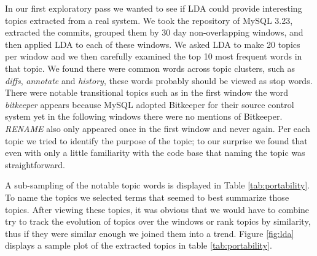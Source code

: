 \documentclass[times, 10pt,twocolumn]{article}
\begin{document}
In our first exploratory pass we wanted to see if LDA could provide
interesting topics extracted from a real system. We took the
repository of MySQL 3.23, extracted the commits, grouped them by 30
day non-overlapping windows, and then applied LDA to each of these
windows. We asked LDA to make 20 topics per window and we then
carefully examined the top 10 most frequent words in that topic.  We
found there were common words across topic clusters, such as
\emph{diffs}, \emph{annotate} and \emph{history}, these words probably should
be viewed as stop words. There were notable transitional topics such
as in the first window the word \emph{bitkeeper} appears because MySQL
adopted Bitkeeper for their source control system yet in the following
windows there were no mentions of Bitkeeper. \emph{RENAME} also only
appeared once in the first window and never again. Per each topic we
tried to identify the purpose of the topic; to our surprise we found
that even with only a little familiarity with the code base that
naming the topic was straightforward.

A sub-sampling of the notable topic words is displayed in Table
\ref{tab:portability}.  To name the topics we selected terms that
seemed to best summarize those topics.  After viewing these topics, it was
obvious that we would have to combine try to track the evolution of
topics over the windows or rank topics by similarity, thus if they
were similar enough we joined them into a trend. Figure \ref{fig:lda}
displays a sample plot of the extracted topics in table
\ref{tab:portability}.


\end{document}
